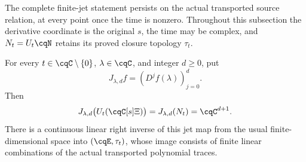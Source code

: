 The complete finite-jet statement persists on the actual transported
source relation, at every point once the time is nonzero.
Throughout this subsection the derivative coordinate is the original
$s$, the time may be complex, and
$N_t=U_t\cqN$ retains its proved closure topology $\tau_t$.

\begin{cqproposition}
\label{prop:cq-moving-finite-jets}
For every $t\in\cqC\setminus\{0\}$, $\lambda\in\cqC$, and
integer $d\ge0$, put
\[
 J_{\lambda,d}f=(D^jf(\lambda))_{j=0}^d.
\]
Then
\begin{equation}
 J_{\lambda,d}\bigl(U_t(\cqC[s]\Xi)\bigr)
   =J_{\lambda,d}(N_t)=\cqC^{d+1}.
 \label{eq:cq-moving-finite-jet-image}
\end{equation}
There is a continuous linear right inverse of this jet map from
the usual finite-dimensional space into $(\cqE,\tau_t)$, whose
image consists of finite linear combinations of the actual
transported polynomial traces.
\end{cqproposition}


